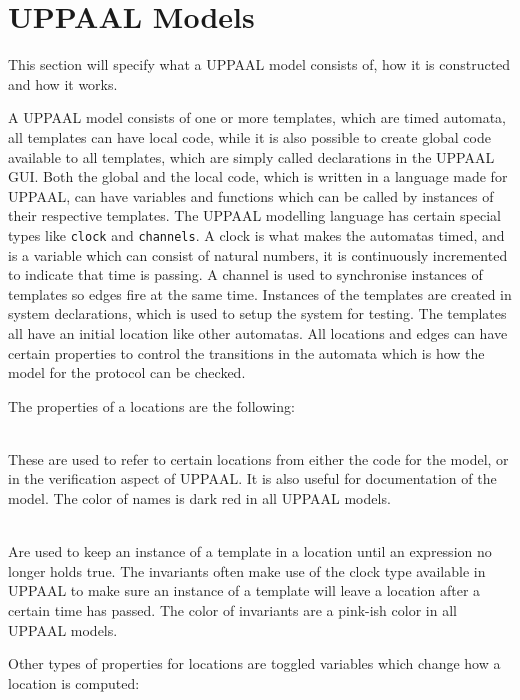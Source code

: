 \section{UPPAAL Models}\label{UPPAAL_Models}
This section will specify what a UPPAAL model consists of, how it is constructed and how it works.

A UPPAAL model consists of one or more templates, which are timed automata, all templates can have local code, while it is also possible to create global code available to all templates, which are simply called declarations in the UPPAAL GUI.
Both the global and the local code, which is written in a language made for UPPAAL, can have variables and functions which can be called by instances of their respective templates.
The UPPAAL modelling language has certain special types like \texttt{clock} and \texttt{channels}.
A clock is what makes the automatas timed, and is a variable which can consist of natural numbers, it is continuously incremented to indicate that time is passing.
A channel is used to synchronise instances of templates so edges fire at the same time.
Instances of the templates are created in system declarations, which is used to setup the system for testing.
The templates all have an initial location like other automatas.
All locations and edges can have certain properties to control the transitions in the automata which is how the model for the protocol can be checked.

\bigskip\noindent
The properties of a locations are the following: 

\begin{description}[labelindent=\parindent]
    \item[Name]\hfill\\
    These are used to refer to certain locations from either the code for the model, or in the verification aspect of UPPAAL. It is also useful for documentation of the model. The color of names is dark red in all UPPAAL models.
    \item[Invariants]\hfill\\
    Are used to keep an instance of a template in a location until an expression no longer holds true. The invariants often make use of the clock type available in UPPAAL to make sure an instance of a template will leave a location after a certain time has passed. The color of invariants are a pink-ish color in all UPPAAL models.
\end{description}

\noindent
Other types of properties for locations are toggled variables which change how a location is computed:

